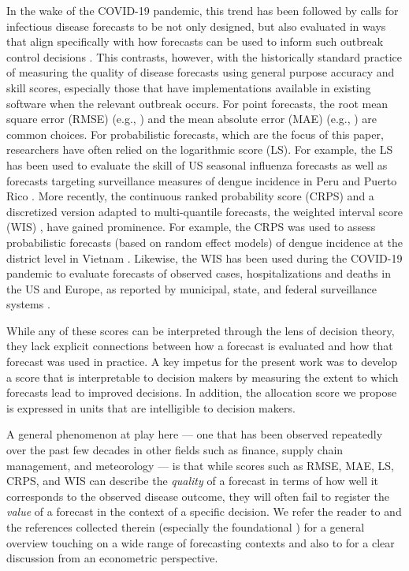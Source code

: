 \documentclass{article}
\begin{document}
In the wake of the COVID-19 pandemic, this trend has been followed by calls for infectious disease forecasts to be not
only designed, but also evaluated in ways that align specifically with how forecasts can be used to inform such outbreak
control decisions \citep{marshall2023predictions, bilinski_adaptive_2023}. This contrasts, however, with the
historically standard practice of measuring the quality of disease forecasts using general purpose accuracy and skill
scores, especially those that have implementations available in existing software when the relevant outbreak occurs. For
point forecasts, the root mean square error (RMSE) (e.g., \cite{papastefanopoulos2020covid}) and the mean absolute error
(MAE) (e.g., \cite{johansson2016evaluating}) are common choices. For probabilistic forecasts, which are the focus of
this paper, researchers have often relied on the logarithmic score (LS). For example, the LS has been used to evaluate
the skill of US seasonal influenza forecasts \citep{mcgowan_collaborative_2019,reich_collaborative_2019} as well as
forecasts targeting surveillance measures of dengue incidence in Peru and Puerto Rico \citep{johansson_open_2019}. More
recently, the continuous ranked probability score (CRPS) and a discretized version adapted to multi-quantile forecasts,
the weighted interval score (WIS) \citep{bracher2021evaluating}, have gained prominence. For example, the CRPS was used
to assess probabilistic forecasts (based on random effect models) of dengue incidence at the district level in Vietnam
\citep{colon-gonzalez_probabilistic_2021}. Likewise, the WIS has been used during the COVID-19 pandemic to evaluate forecasts
of observed cases, hospitalizations and deaths in the US and Europe, as reported by municipal, state, and federal
surveillance systems \citep{cramer_evaluation_2022,fox_real-time_2022,sherratt2023predictive}.

While any of these scores can be interpreted through the lens of decision theory, they lack explicit connections between how a forecast is evaluated and how that forecast was used in practice. A key impetus for the present work was to develop a score that is interpretable to decision makers by measuring the extent to which forecasts lead to improved decisions. In addition, the allocation score we propose is expressed in units that are intelligible to decision makers.

A general phenomenon at play here --- one that has been observed repeatedly over the past few decades in other fields
such as finance, supply chain management, and meteorology --- is that while scores such as RMSE, MAE, LS, CRPS, and WIS
can describe the \emph{quality} of a forecast in terms of how well it corresponds to the observed disease outcome, they
will often fail to register the \emph{value} of a forecast in the context of a specific decision. We refer the reader to
\cite{yardley2021utility_cost_forecasts} and the references collected therein (especially the foundational
\cite{murphy1993whatisagoodforecast}) for a general overview touching on a wide range of forecasting contexts and  also
to \cite{pesaran2002decision_based_eval} for a clear discussion from an econometric perspective.
\end{document}
